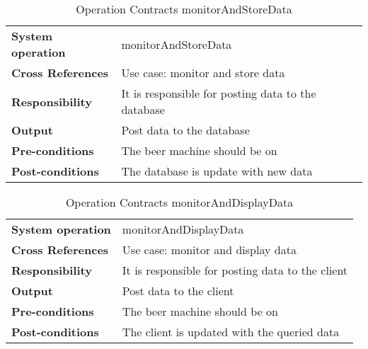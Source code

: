 \begin{table}[H]
    \begin{tabularx}{\textwidth}{|>{\RaggedRight}p{3.7cm}|>{\RaggedRight}X|}
        \hline
        \multicolumn{2}{|c|}{\textbf{monitorAndStoreData}}\\
        \hline
        \textbf{System operation} & monitorAndStoreData\\
        \hline
        \textbf{Cross References} & Use case: monitor and store data \\
        \hline
        \textbf{Responsibility} & It is responsible for posting data to the database \\
        \hline
        \textbf{Output} & Post data to the database \\
        \hline
        \textbf{Pre-conditions} & The beer machine should be on \\
        \hline
        \textbf{Post-conditions} & The database is update with new data \\
        \hline
    \end{tabularx}
    \caption{Operation Contracts monitorAndStoreData} 
    \label{table:Operation_Contracts_monitorAndStoreData}
\end{table}

\begin{table}[H]
    \begin{tabularx}{\textwidth}{|>{\RaggedRight}p{3.7cm}|>{\RaggedRight}X|}
        \hline
        \multicolumn{2}{|c|}{\textbf{monitorAndDisplayData}}\\
        \hline
        \textbf{System operation} & monitorAndDisplayData\\
        \hline
        \textbf{Cross References} & Use case: monitor and display data\\
        \hline
        \textbf{Responsibility} & It is responsible for posting data to the client \\ 
        \hline
        \textbf{Output} & Post data to the client  \\
        \hline
        \textbf{Pre-conditions} & The beer machine should be on\\
        \hline
        \textbf{Post-conditions} & The client is updated with the queried data\\
        \hline
    \end{tabularx}
    \caption{Operation Contracts monitorAndDisplayData} 
    \label{table:Operation_Contracts_monitorAndDisplayData}
\end{table}

